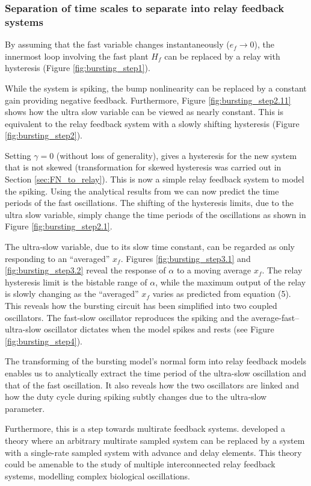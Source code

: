 \documentclass[a4paper, 12pt]{article}
\begin{document}
\subsubsection{Separation of time scales to separate into relay feedback systems}
By assuming that the fast variable changes instantaneously ($e_f\rightarrow0$), the innermost loop involving the fast plant $H_f$ can be replaced by a relay with hysteresis (Figure \ref{fig:bursting_step1}). 

While the system is spiking, the bump nonlinearity can be replaced by a constant gain providing negative feedback. Furthermore, Figure \ref{fig:bursting_step2.11} shows how the ultra slow variable can be viewed as nearly constant. This is equivalent to the relay feedback system with a slowly shifting hysteresis (Figure \ref{fig:bursting_step2}). 

Setting $\gamma = 0$ (without loss of generality), gives a hysteresis for the new system that is not skewed (transformation for skewed hysteresis was carried out in Section \ref{sec:FN_to_relay}). This is now a simple relay feedback system to model the spiking. Using the analytical results from \cite{astrom1995} we can now predict the time periods of the fast oscillations. The shifting of the hysteresis limits, due to the ultra slow variable, simply change the time periods of the oscillations as shown in Figure \ref{fig:bursting_step2.1}.

The ultra-slow variable, due to its slow time constant, can be regarded as only responding to an ``averaged'' $x_f$. Figures \ref{fig:bursting_step3.1} and \ref{fig:bursting_step3.2} reveal the response of $\alpha$ to a moving average $x_f$. The relay hysteresis limit is the bistable range of $\alpha$, while the maximum output of the relay is slowly changing as the ``averaged'' $x_f$ varies as predicted from equation (5). This reveals how the bursting circuit has been simplified into two coupled oscillators. The fast-slow oscillator reproduces the spiking and the average-fast--ultra-slow oscillator dictates when the model spikes and rests (see Figure \ref{fig:bursting_step4}). 

The transforming of the bursting model's normal form into relay feedback models enables us to analytically extract the time period of the ultra-slow oscillation and that of the fast oscillation. It also reveals how the two oscillators are linked and how the duty cycle during spiking subtly changes due to the ultra-slow parameter. 

Furthermore, this is a step towards multirate feedback systems. \cite{kranc} developed a theory where an arbitrary multirate sampled system can be replaced by a system with a single-rate sampled system with advance and delay elements. This theory could be amenable to the study of multiple interconnected relay feedback systems, modelling complex biological oscillations. 
\end{document}
